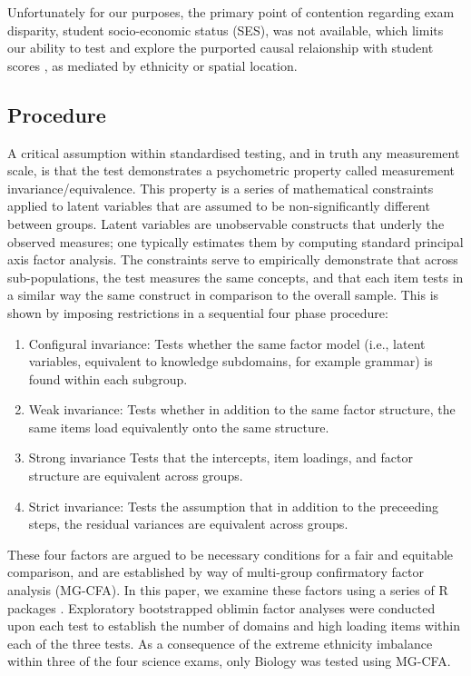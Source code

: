 \documentclass{article}\usepackage[]{graphicx}\usepackage[]{color}
\begin{document}
Unfortunately for our purposes, the primary point of contention regarding exam disparity, student socio-economic status (SES), was not available, which limits our ability to test and explore the purported causal relaionship with student scores \cite{Gaudet}, as mediated by ethnicity or spatial location. 

\subsection{Procedure}
A critical assumption within standardised testing, and in truth any measurement scale, is that the test demonstrates a psychometric property called measurement invariance/equivalence. This property is a series of mathematical constraints applied to latent variables that are assumed to be non-significantly different between groups. Latent variables are unobservable constructs that underly the observed measures; one typically estimates them by computing standard principal axis factor analysis. The constraints serve to empirically demonstrate that across sub-populations, the test measures the same concepts, and that each item tests in a similar way the same construct in comparison to the overall sample. This is shown by imposing restrictions in a sequential four phase procedure:
\begin{enumerate}
\item{Configural invariance:} 
Tests whether the same factor model (i.e., latent variables, equivalent to knowledge subdomains, for example grammar) is found within each subgroup.
\item{Weak invariance:}
Tests whether in addition to the same factor structure, the same items load equivalently onto the same structure.
\item{Strong invariance}
Tests that the intercepts, item loadings, and factor structure are equivalent across groups.
\item{Strict invariance:}
Tests the assumption that in addition to the preceeding steps, the residual variances are equivalent across groups.
\end{enumerate}
These four factors are argued to be necessary conditions for a fair and equitable comparison\cite{Meredith}, and are established by way of multi-group confirmatory factor analysis (MG-CFA). In this paper, we examine these factors using a series of R packages \cite{psych,lavaan,semTools}. 
Exploratory bootstrapped oblimin factor analyses were conducted upon each test to establish the number of domains and high loading items within each of the three tests. As a consequence of the extreme ethnicity imbalance within three of the four science exams, only Biology was tested using MG-CFA.
\end{document}
